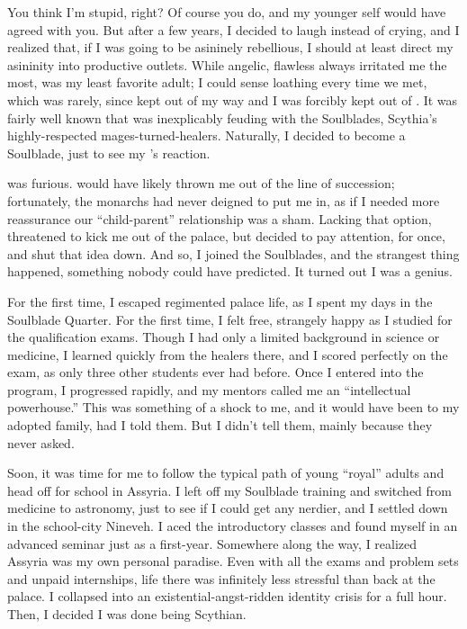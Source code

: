 \documentclass[char]{Kos}
\begin{document}
You think I'm stupid, right? Of course you do, and my younger self would have agreed with you. But after a few years, I decided to laugh instead of crying, and I realized that, if I was going to be asininely rebellious, I should at least direct my asininity into productive outlets. While angelic, flawless \cBride{} always irritated me the most, \cBride{\their} \cScythiaQueen{\parent} \cScythiaQueen{} was my least favorite adult; I could sense \cScythiaQueen{\their} loathing every time we met, which was rarely, since \cScythiaQueen{\they} kept out of my way and I was forcibly kept out of \cScythiaQueen{\theirs}. It was fairly well known that \cScythiaQueen{\they} was inexplicably feuding with the Soulblades, Scythia's highly-respected mages-turned-healers. Naturally, I decided to become a Soulblade, just to see my \cScythiaQueen{\parent}'s reaction.

\cScythiaQueen{\They} was furious. \cScythiaQueen{\They} would have likely thrown me out of the line of succession; fortunately, the monarchs had never deigned to put me in, as if I needed more reassurance our ``child-parent'' relationship was a sham. Lacking that option, \cScythiaQueen{\they} threatened to kick me out of the palace, but \cScythiaQueen{\their} \cScythiaKing{\spouse} decided to pay attention, for once, and shut that idea down. And so, I joined the Soulblades, and the strangest thing happened, something nobody could have predicted. It turned out I was a genius.

For the first time, I escaped regimented palace life, as I spent my days in the Soulblade Quarter. For the first time, I felt free, strangely happy as I studied for the qualification exams. Though I had only a limited background in science or medicine, I learned quickly from the healers there, and I scored perfectly on the exam, as only three other students ever had before. Once I entered into the program, I progressed rapidly, and my mentors called me an ``intellectual powerhouse.'' This was something of a shock to me, and it would have been to my adopted family, had I told them. But I didn't tell them, mainly because they never asked.

Soon, it was time for me to follow the typical path of young ``royal'' adults and head off for school in Assyria. I left off my Soulblade training and switched from medicine to astronomy, just to see if I could get any nerdier, and I settled down in the school-city Nineveh. I aced the introductory classes and found myself in an advanced seminar just as a first-year. Somewhere along the way, I realized Assyria was my own personal paradise. Even with all the exams and problem sets and unpaid internships, life there was infinitely less stressful than back at the palace. I collapsed into an existential-angst-ridden identity crisis for a full hour. Then, I decided I was done being Scythian.
\end{document}
